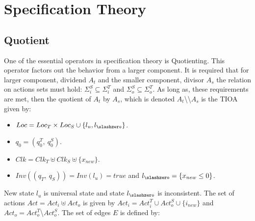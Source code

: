 \chapter{Specification Theory}\label{ch:spec_theory}

\section{Quotient}
One of the essential operators in specification theory is Quotienting. This operator factors out the behavior from a larger component. It is required that for larger component, dividend $A_t$ and the smaller component, divisor  $A_s$ the relation on actions sets must hold: $\Sigma_i^S \subseteq \Sigma_i^T$ and $\Sigma_o^S \subseteq \Sigma_o^T$. As long as, these requirements are met, then the quotient of $A_t$ by $A_s$, which is denoted  $A_t$\textbackslash\textbackslash$A_s$ is the TIOA given by:
\begin{itemize}
	\item $Loc = Loc_T \times Loc_S \cup \{l_u, l_{\slashzero}\}$.
	\item $q_0 = (q_0^T,\ q_0^S)$.
	\item $Clk = Clk_T \uplus Clk_S \uplus \{x_{new}\}$.
	\item $Inv((q_T,\ q_S)) = Inv(l_u) = true$ and $l_{\slashzero} = \{x_{new}\leq 0\}$.
\end{itemize}
New state $l_u$ is universal state and state $l_{\slashzero}$ is inconsistent. The set of actions $Act = Act_i \uplus Act_o$ is given by $Act_i = Act_i^T \cup Act_o^S \cup \{i_{new}\}$ and $Act_o = Act_o^T$\textbackslash$Act_o^S$. The set of edges $E$ is defined by:
	
